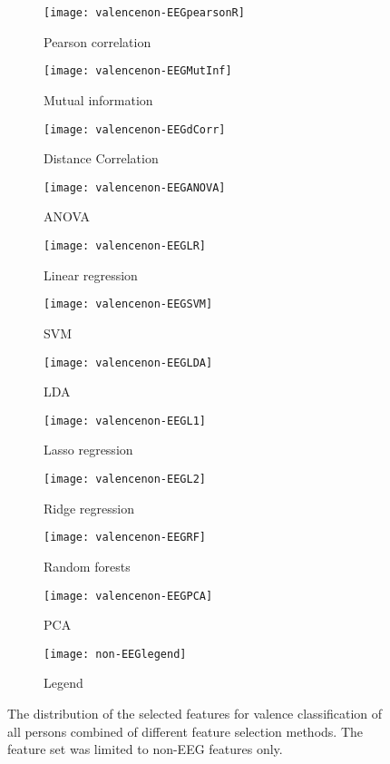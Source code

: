 \clearpage

\begin{figure}[!tbp]
  \centering
  \begin{subfigure}[b]{0.3\textwidth}
    \texttt{[image: valencenon-EEGpearsonR]}
    \caption{Pearson correlation}
  \end{subfigure}
  \hfill
  \begin{subfigure}[b]{0.3\textwidth}
    \texttt{[image: valencenon-EEGMutInf]}
    \caption{Mutual information}
  \end{subfigure}
  \hfill
  \begin{subfigure}[b]{0.3\textwidth}
    \texttt{[image: valencenon-EEGdCorr]}
    \caption{Distance Correlation}
  \end{subfigure}
  
  \begin{subfigure}[b]{0.3\textwidth}
    \texttt{[image: valencenon-EEGANOVA]}
    \caption{ANOVA}
  \end{subfigure}
  \hfill
  \begin{subfigure}[b]{0.3\textwidth}
    \texttt{[image: valencenon-EEGLR]}
    \caption{Linear regression}
  \end{subfigure}
  \hfill
  \begin{subfigure}[b]{0.3\textwidth}
    \texttt{[image: valencenon-EEGSVM]}
    \caption{SVM}
  \end{subfigure}
  
  \begin{subfigure}[b]{0.3\textwidth}
    \texttt{[image: valencenon-EEGLDA]}
    \caption{LDA}
  \end{subfigure}
  \hfill
  \begin{subfigure}[b]{0.3\textwidth}
    \texttt{[image: valencenon-EEGL1]}
    \caption{Lasso regression}
  \end{subfigure}
  \hfill
  \begin{subfigure}[b]{0.3\textwidth}
    \texttt{[image: valencenon-EEGL2]}
    \caption{Ridge regression}
  \end{subfigure}
  
  \begin{subfigure}[b]{0.3\textwidth}
    \texttt{[image: valencenon-EEGRF]}
    \caption{Random forests}
  \end{subfigure}
  \hfill
  \begin{subfigure}[b]{0.3\textwidth}
    \texttt{[image: valencenon-EEGPCA]}
    \caption{PCA}
  \end{subfigure}
  \hfill
  \begin{subfigure}[b]{0.3\textwidth}
    \texttt{[image: non-EEGlegend]}
    \caption{Legend\label{valencepiesnon-EEGlegend}}
  \end{subfigure}
  \caption{The distribution of the selected features for valence classification of all persons combined of different feature selection methods. The feature set was limited to non-EEG features only.\label{valencenon-EEGpies}}
\end{figure}
\clearpage

